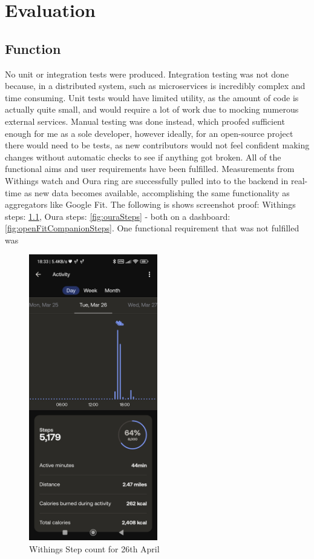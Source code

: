 \chapter{Evaluation}
\label{cha:evaluation}
\section{Function}
No unit or integration tests were produced. Integration testing was not done because, in a distributed system, such as microservices is incredibly complex and time consuming. Unit tests would have limited utility, as the amount of code is actually quite small, and would require a lot of work due to mocking numerous external services. Manual testing was done instead, which proofed sufficient enough for me as a sole developer, however ideally, for an open-source project there would need to be tests, as new contributors would not feel confident making changes without automatic checks to see if anything got broken.
All of the functional aims and user requirements have been fulfilled. Measurements from Withings watch and Oura ring are successfully pulled into to the backend in real-time as new data becomes available, accomplishing the same functionality as aggregators like Google Fit. The following is shows screenshot proof: Withings steps: \ref{fig:withingsSteps}, Oura steps: \ref{fig:ouraSteps} - both on a dashboard: \ref{fig:openFitCompanionSteps}. 
One functional requirement that was not fulfilled was 
\begin{figure}
    
    \centering
    \includegraphics[width=0.5\textwidth,keepaspectratio]{../images/WithingsActivity.jpg}
    \caption{Withings Step count for 26th April}
    \label{fig:withingsSteps}
    
\end{figure}


